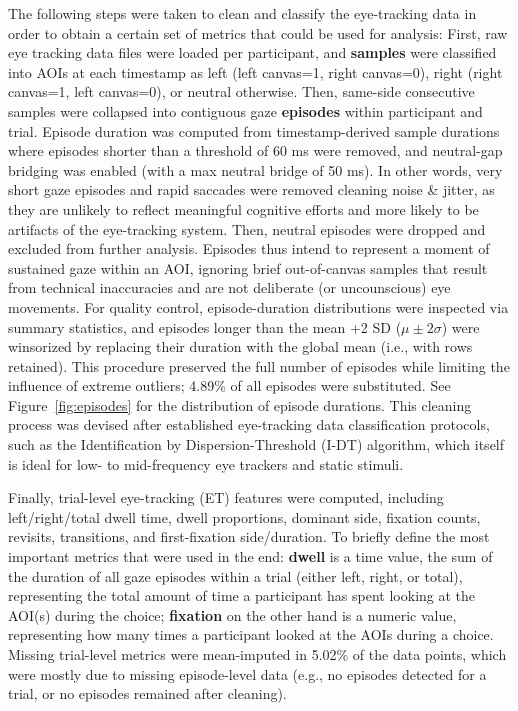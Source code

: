 \documentclass[ruler]{CUP-JNL-LIN}%
\begin{document}
The following steps were taken to clean and classify the eye-tracking data in order to obtain a certain set of metrics that could be used for analysis: First, raw eye tracking data files were loaded per participant, and \textbf{samples} were classified into AOIs at each timestamp as left (left canvas=1, right canvas=0), right (right canvas=1, left canvas=0), or neutral otherwise. Then, same-side consecutive samples were collapsed into contiguous gaze \textbf{episodes} within participant and trial. Episode duration was computed from timestamp-derived sample durations where episodes shorter than a threshold of 60 ms were removed, and neutral-gap bridging was enabled (with a max neutral bridge of 50 ms). In other words, very short gaze episodes and rapid saccades were removed cleaning noise \& jitter, as they are unlikely to reflect meaningful cognitive efforts and more likely to be artifacts of the eye-tracking system. Then, neutral episodes were dropped and excluded from further analysis. Episodes thus intend to represent a moment of sustained gaze within an AOI, ignoring brief out-of-canvas samples that result from technical inaccuracies and are not deliberate (or uncounscious) eye movements. For quality control, episode-duration distributions were inspected via summary statistics, and episodes longer than the mean +2 SD ($\mu \pm 2\sigma$) were winsorized by replacing their duration with the global mean (i.e., with rows retained). This procedure preserved the full number of episodes while limiting the influence of extreme outliers; 4.89\% of all episodes were substituted. See Figure~\ref{fig:episodes} for the distribution of episode durations. This cleaning process was devised after established eye-tracking data classification protocols, such as the Identification by Dispersion-Threshold (I-DT) algorithm, which itself is ideal for low- to mid-frequency eye trackers and static stimuli.

Finally, trial-level eye-tracking (ET) features were computed, including left/right/total dwell time, dwell proportions, dominant side, fixation counts, revisits, transitions, and first-fixation side/duration. To briefly define the most important metrics that were used in the end: \textbf{dwell} is a time value, the sum of the duration of all gaze episodes within a trial (either left, right, or total), representing the total amount of time a participant has spent looking at the AOI(s) during the choice; \textbf{fixation} on the other hand is a numeric value, representing how many times a participant looked at the AOIs during a choice. Missing trial-level metrics were mean-imputed in 5.02\% of the data points, which were mostly due to missing episode-level data (e.g., no episodes detected for a trial, or no episodes remained after cleaning).
\end{document}
